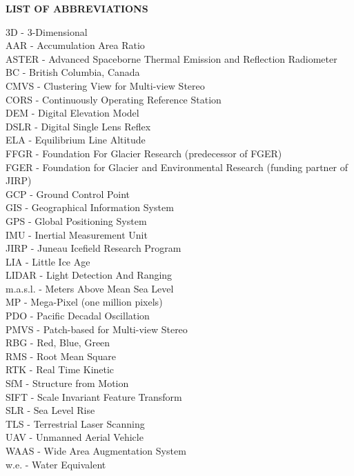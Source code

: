 \begin{center}
\textbf{LIST OF ABBREVIATIONS}
\end{center}
\begin{multicols}{2}
\noindent 3D - 3-Dimensional\\
\noindent AAR - Accumulation Area Ratio\\
\noindent ASTER - Advanced Spaceborne Thermal Emission and Reflection Radiometer\\
\noindent BC - British Columbia, Canada\\
\noindent CMVS - Clustering View for Multi-view Stereo\\
\noindent CORS - Continuously Operating Reference Station\\
\noindent DEM - Digital Elevation Model\\
\noindent DSLR - Digital Single Lens Reflex\\
\noindent ELA - Equilibrium Line Altitude\\
\noindent FFGR - Foundation For Glacier Research (predecessor of FGER)\\
\noindent FGER - Foundation for Glacier and Environmental Research (funding partner of JIRP)\\
\noindent GCP - Ground Control Point\\
\noindent GIS - Geographical Information System\\
\noindent GPS - Global Positioning System\\
\noindent IMU - Inertial Measurement Unit\\
\noindent JIRP - Juneau Icefield Research Program\\
\noindent LIA - Little Ice Age\\
\noindent LIDAR - Light Detection And Ranging\\
\noindent m.a.s.l. - Meters Above Mean Sea Level\\
\noindent MP - Mega-Pixel (one million pixels)\\
\noindent PDO - Pacific Decadal Oscillation\\
\noindent PMVS - Patch-based for Multi-view Stereo\\
\noindent RBG - Red, Blue, Green\\
\noindent RMS - Root Mean Square\\
\noindent RTK - Real Time Kinetic\\
\noindent SfM - Structure from Motion\\
\noindent SIFT - Scale Invariant Feature Transform\\
\noindent SLR - Sea Level Rise\\
\noindent TLS - Terrestrial Laser Scanning\\
\noindent UAV - Unmanned Aerial Vehicle\\
\noindent WAAS - Wide Area Augmentation System\\
\noindent w.e. - Water Equivalent\\
\end{multicols}
\endinput